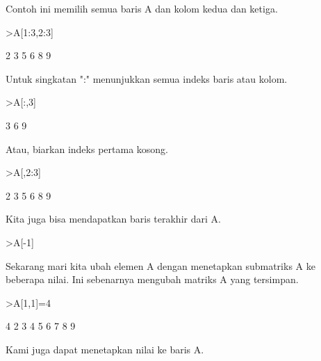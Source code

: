 \documentclass[a4paper,10pt]{article}
\begin{document}
\begin{eulernotebook}
\begin{eulercomment}
\begin{eulercomment}
\begin{eulercomment}
\begin{eulercomment}
\begin{eulercomment}
Contoh ini memilih semua baris A dan kolom kedua dan ketiga.
\end{eulercomment}
\begin{eulerprompt}
>A[1:3,2:3]
\end{eulerprompt}
\begin{euleroutput}
              2             3 
              5             6 
              8             9 
\end{euleroutput}
\begin{eulercomment}
Untuk singkatan ":" menunjukkan semua indeks baris atau kolom.
\end{eulercomment}
\begin{eulerprompt}
>A[:,3]
\end{eulerprompt}
\begin{euleroutput}
              3 
              6 
              9 
\end{euleroutput}
\begin{eulercomment}
Atau, biarkan indeks pertama kosong.
\end{eulercomment}
\begin{eulerprompt}
>A[,2:3]
\end{eulerprompt}
\begin{euleroutput}
              2             3 
              5             6 
              8             9 
\end{euleroutput}
\begin{eulercomment}
Kita juga bisa mendapatkan baris terakhir dari A.
\end{eulercomment}
\begin{eulerprompt}
>A[-1]
\end{eulerprompt}
\begin{euleroutput}
  [7,  8,  9]
\end{euleroutput}
\begin{eulercomment}
Sekarang mari kita ubah elemen A dengan menetapkan submatriks A ke
beberapa nilai. Ini sebenarnya mengubah matriks A yang tersimpan.
\end{eulercomment}
\begin{eulerprompt}
>A[1,1]=4
\end{eulerprompt}
\begin{euleroutput}
              4             2             3 
              4             5             6 
              7             8             9 
\end{euleroutput}
\begin{eulercomment}
Kami juga dapat menetapkan nilai ke baris A.

\end{eulercomment}
\end{eulercomment}
\end{eulercomment}
\end{eulercomment}
\end{eulercomment}
\end{eulernotebook}
\end{document}
